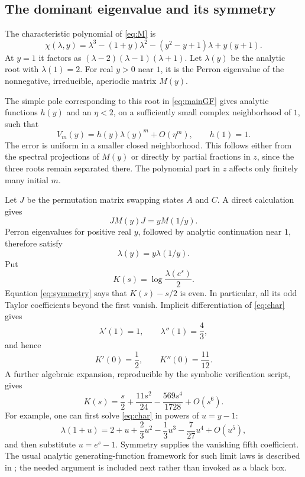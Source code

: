 \documentclass[11pt]{article}
\theoremstyle{definition}\newtheorem{definition}[theorem]{Definition}
\theoremstyle{remark}\newtheorem{remark}[theorem]{Remark}
\begin{document}
\subsection{The dominant eigenvalue and its symmetry}
The characteristic polynomial of \eqref{eq:M} is
\begin{equation}\label{eq:char}
 \chi(\lambda,y)=\lambda^3-(1+y)\lambda^2
 -(y^2-y+1)\lambda+y(y+1).
\end{equation}
At $y=1$ it factors as $(\lambda-2)(\lambda-1)(\lambda+1)$.
Let $\lambda(y)$ be the analytic root with $\lambda(1)=2$.
For real $y>0$ near $1$, it is the Perron eigenvalue of the nonnegative,
irreducible, aperiodic matrix $M(y)$.

The simple pole corresponding to this root in \eqref{eq:mainGF} gives
analytic functions $h(y)$ and an $\eta<2$, on a sufficiently small complex
neighborhood of $1$, such that
\begin{equation}\label{eq:quasipower}
 V_m(y)=h(y)\lambda(y)^m+O(\eta^m),\qquad h(1)=1.
\end{equation}
The error is uniform in a smaller closed neighborhood. This follows
either from the spectral projections of $M(y)$ or directly by partial
fractions in $z$, since the three roots remain separated there. The
polynomial part in $z$ affects only finitely many initial $m$.

Let $J$ be the permutation matrix swapping states $A$ and $C$. A direct
calculation gives
\[
 JM(y)J=yM(1/y).
\]
Perron eigenvalues for positive real $y$, followed by analytic
continuation near $1$, therefore satisfy
\begin{equation}\label{eq:symmetry}
 \lambda(y)=y\lambda(1/y).
\end{equation}
Put
\[
 K(s)=\log\frac{\lambda(e^s)}2.
\]
Equation \eqref{eq:symmetry} says that $K(s)-s/2$ is even. In particular,
all its odd Taylor coefficients beyond the first vanish.
Implicit differentiation of \eqref{eq:char} gives
\[
 \lambda'(1)=1,\qquad\lambda''(1)=\frac43,
\]
and hence
\begin{equation}\label{eq:Ktaylor}
 K'(0)=\frac12,\qquad K''(0)=\frac{11}{12}.
\end{equation}
A further algebraic expansion, reproducible by the symbolic verification
script, gives
\begin{equation}\label{eq:Kexpansion}
 K(s)=\frac s2+\frac{11s^2}{24}-\frac{569s^4}{1728}+O(s^6).
\end{equation}
For example, one can first solve \eqref{eq:char} in powers of $u=y-1$:
\[
 \lambda(1+u)=2+u+\frac23u^2-\frac13u^3-\frac7{27}u^4+O(u^5),
\]
and then substitute $u=e^s-1$. Symmetry supplies the vanishing fifth
coefficient. The usual analytic generating-function framework for such
limit laws is described in \cite{FS}; the needed argument is included
next rather than invoked as a black box.
\end{document}
